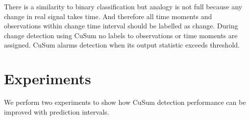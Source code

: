There is a similarity to binary classification but analogy is not full because any change in real signal takes time.
And therefore all time moments and observations within change time interval should be labelled as change.
During change detection using CuSum no labels to observations or time moments are assigned.
CuSum alarms detection when its output statistic exceeds threshold.
%
% 		
% 		


\section{Experiments}\label{sec:experiments}
We perform two experiments to show how CuSum detection performance can be improved with prediction intervals. 

